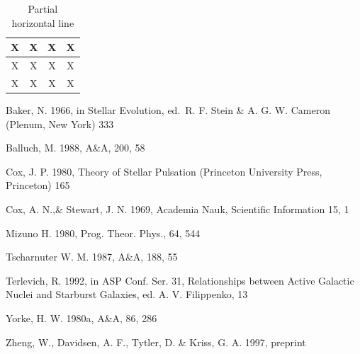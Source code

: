 \documentclass[letterpaper,12pt]{article}
\begin{document}
\begin{table}[ht]

\caption{Partial horizontal line}

\begin{center}

\begin{tabular}{ || c || c || c || c ||}

\hline \hline


\rowcolor {red! 50} X&X&X&X\\
\hline \hline
\rowcolor {green! 70} X&X&X&X\\
\hline \hline
\rowcolor {blue! 10} X&X&X&X \\
\hline \hline

\end{tabular}

\end{center}

\label{tab:multicol}

\end{table}

\begin{thebibliography}{}

   Baker, N. 1966,
      in Stellar Evolution,
      ed.\ R. F. Stein \& A. G. W. Cameron
      (Plenum, New York) 333

    Balluch, M. 1988,
      A\&A, 200, 58

    Cox, J. P. 1980,
      Theory of Stellar Pulsation
      (Princeton University Press, Princeton) 165

    Cox, A. N.,\& Stewart, J. N. 1969,
      Academia Nauk, Scientific Information 15, 1

    Mizuno H. 1980,
      Prog. Theor. Phys., 64, 544
   
    Tscharnuter W. M. 1987,
      A\&A, 188, 55
  
    Terlevich, R. 1992, in ASP Conf. Ser. 31, 
      Relationships between Active Galactic Nuclei and Starburst Galaxies, 
      ed. A. V. Filippenko, 13

    Yorke, H. W. 1980a,
      A\&A, 86, 286

    Zheng, W., Davidsen, A. F., Tytler, D. \& Kriss, G. A.
      1997, preprint
\end{thebibliography}
\end{document}
